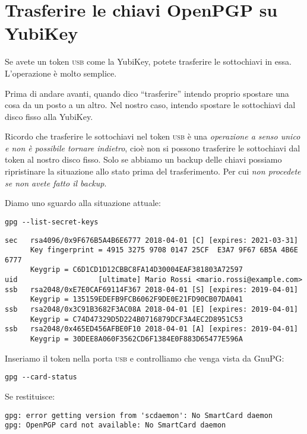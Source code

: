 \section{Trasferire le chiavi OpenPGP su YubiKey}

Se avete un token \textsc{usb} come la YubiKey, potete trasferire le sottochiavi
in essa. L'operazione è molto semplice.

Prima di andare avanti, quando dico ``trasferire'' intendo proprio spostare una
cosa da un posto a un altro. Nel nostro caso, intendo spostare le sottochiavi
dal disco fisso alla YubiKey.

Ricordo che trasferire le sottochiavi nel token \textsc{usb} è una
\emph{operazione a senso unico e non è possibile tornare indietro}, cioè non
si possono trasferire le sottochiavi dal token al nostro disco fisso. Solo se
abbiamo un backup delle chiavi possiamo ripristinare la situazione allo stato
prima del trasferimento. Per cui \emph{non procedete se non avete fatto il
backup}.

Diamo uno sguardo alla situazione attuale:

\begin{lstlisting}
gpg --list-secret-keys
\end{lstlisting}

\begin{lstlisting}
sec   rsa4096/0x9F676B5A4B6E6777 2018-04-01 [C] [expires: 2021-03-31]
      Key fingerprint = 4915 3275 9708 0147 25CF  E3A7 9F67 6B5A 4B6E 6777
      Keygrip = C6D1CD1D12CBBC8FA14D30004EAF381803A72597
uid                   [ultimate] Mario Rossi <mario.rossi@example.com>
ssb   rsa2048/0xE7E0CAF69114F367 2018-04-01 [S] [expires: 2019-04-01]
      Keygrip = 135159EDEFB9FCB6062F9DE0E21FD90CB07DA041
ssb   rsa2048/0x3C91B3682F3AC08A 2018-04-01 [E] [expires: 2019-04-01]
      Keygrip = C74D47329D5D224B0716879DCF3A4EC2D8951C53
ssb   rsa2048/0x465ED456AFBE0F10 2018-04-01 [A] [expires: 2019-04-01]
      Keygrip = 30DEE8A060F3562CD6F1384E0F883D65477E596A
\end{lstlisting}

Inseriamo il token nella porta \textsc{usb} e controlliamo che venga vista da
GnuPG:

\begin{lstlisting}
gpg --card-status
\end{lstlisting}

Se restituisce:

\begin{lstlisting}
gpg: error getting version from 'scdaemon': No SmartCard daemon
gpg: OpenPGP card not available: No SmartCard daemon
\end{lstlisting}

